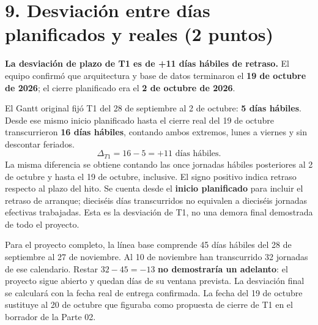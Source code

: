 \documentclass[11pt,letterpaper]{article}
\begin{document}
\section*{9. Desviación entre días planificados y reales (2 puntos)}
\textbf{La desviación de plazo de T1 es de +11 días hábiles de retraso.}
El equipo confirmó que arquitectura y base de datos terminaron el
\textbf{19 de octubre de 2026}; el cierre planificado era el
\textbf{2 de octubre de 2026}.

El Gantt original fijó T1 del 28 de septiembre al 2 de octubre:
\textbf{5 días hábiles}. Desde ese mismo inicio planificado hasta el cierre
real del 19 de octubre transcurrieron \textbf{16 días hábiles}, contando
ambos extremos, lunes a viernes y sin descontar feriados.
\[
\Delta_{T1}=16-5=\boxed{+11\text{ días hábiles}}.
\]
La misma diferencia se obtiene contando las once jornadas hábiles posteriores
al 2 de octubre y hasta el 19 de octubre, inclusive. El signo positivo
indica retraso respecto al plazo del hito. Se cuenta desde el
\textbf{inicio planificado} para incluir el retraso de arranque; dieciséis
días transcurridos no equivalen a dieciséis jornadas efectivas trabajadas.
Esta es la desviación de T1, no una demora final demostrada de todo el proyecto.

Para el proyecto completo, la línea base comprende 45 días hábiles del
28 de septiembre al 27 de noviembre. Al 10 de noviembre han transcurrido
32 jornadas de ese calendario. Restar $32-45=-13$ \textbf{no demostraría un
adelanto}: el proyecto sigue abierto y quedan días de su ventana prevista.
La desviación final se calculará con la fecha real de entrega confirmada.
La fecha del 19 de octubre sustituye al 20 de octubre que figuraba como
propuesta de cierre de T1 en el borrador de la Parte 02.
\end{document}
